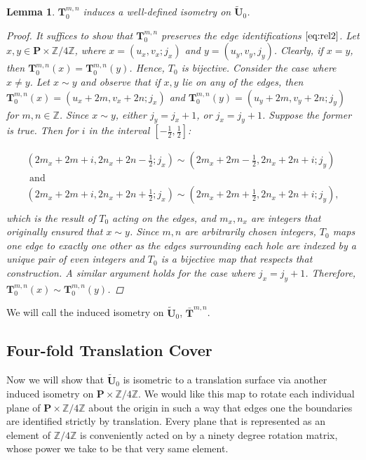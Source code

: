 \documentclass[]{article}
\newtheorem{lem}{Lemma}[section]
\begin{document}
\begin{lem}$\mathbf{T}^{m,n}_{0}$ induces a well-defined isometry on $\tilde{\mathbf{U}}_0$.
\begin{proof}
It suffices to show that $\mathbf{T}^{m,n}_{0}$ preserves the edge identifications $\eqref{eq:rel2}$. Let $x,y\in\mathbf{P}\times\mathbb{Z}/4\mathbb{Z}$, where $x=(u_x,v_x;j_x)$ and $y=(u_y,v_y,j_y)$. Clearly, if $x=y$, then $\mathbf{T}^{m,n}_{0}(x)=\mathbf{T}^{m,n}_{0}(y)$. Hence, $T_0$ is bijective. Consider the case where $x\neq y$. Let $x\sim y$ and observe that if $x,y$ lie on any of the edges, then $\mathbf{T}^{m,n}_{0}(x)=(u_x+2m,v_x+2n;j_x)$ and $\mathbf{T}^{m,n}_{0}(y)=(u_y+2m,v_y+2n;j_y)$ for $m,n\in\mathbb{Z}$. Since $x\sim y$, either $j_y=j_x+1$, or $j_x=j_y+1$. Suppose the former is true. Then for $i$ in the interval $[-\frac{1}{2},\frac{1}{2}]$:

\begin{equation*}
\begin{split}
(2m_x+2m+i, 2n_x+2n-\frac{1}{2};j_x)\sim(2m_x+2m-\frac{1}{2},2n_x+2n+i;j_y)\\\text{ and }\hspace{2in}\\
(2m_x+2m+i, 2n_x+2n+\frac{1}{2};j_x)\sim(2m_x+2m+\frac{1}{2},2n_x+2n+i;j_y),\\
\end{split}
\end{equation*}
which is the result of $T_0$ acting on the edges, and $m_x,n_x$ are integers that originally ensured that $x\sim y$. Since $m,n$ are arbitrarily chosen integers, $T_0$ maps one edge to exactly one other as the edges surrounding each hole are indexed by a unique pair of even integers and $T_0$  is a bijective map that respects that construction. A similar argument holds for the case where $j_x=j_y+1$. Therefore, $\mathbf{T}^{m,n}_{0}(x)\sim\mathbf{T}^{m,n}_{0}(y)$.
\end{proof}
\end{lem}

We will call the induced isometry on $\tilde{\mathbf{U}}_0$, $\bar{\mathbf{T}}^{m,n}$.

\subsection{Four-fold Translation Cover}

 Now we will show that $\tilde{\mathbf{U}}_0$ is isometric to a translation surface via another induced isometry on $\mathbf{P}\times\mathbb{Z}/4\mathbb{Z}$. We would like this map to rotate each individual plane of $\mathbf{P}\times\mathbb{Z}/4\mathbb{Z}$ about the origin in such a way that edges one the boundaries are identified strictly by translation. Every plane that is represented as an element of $\mathbb{Z}/4\mathbb{Z}$ is conveniently acted on by a ninety degree rotation matrix, whose power we take to be that very same element.
\end{document}
